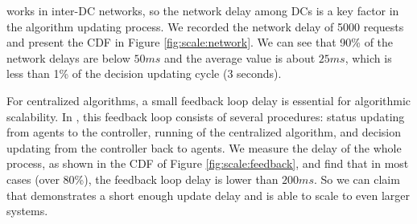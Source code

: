  \name works in inter-DC networks, so the network delay among DCs is a key factor in the algorithm updating process. We recorded the network delay of 5000 requests and present the CDF in Figure \ref{fig:scale:network}. We can see that 90\% of the network delays are below $50ms$ and the average value is about $25ms$, which is less than 1\% of the decision updating cycle (3 seconds).

 For centralized algorithms, a small feedback loop delay is essential for algorithmic scalability. In \name, this feedback loop consists of several procedures: status updating from agents to the controller, running of the centralized algorithm, and decision updating from the controller back to agents. We measure the delay of the whole process, as shown in the CDF of Figure \ref{fig:scale:feedback}, and find that in most cases (over 80\%), the feedback loop delay is lower than $200ms$. So we can claim that \name demonstrates a short enough update delay and is able to scale to even larger systems.

